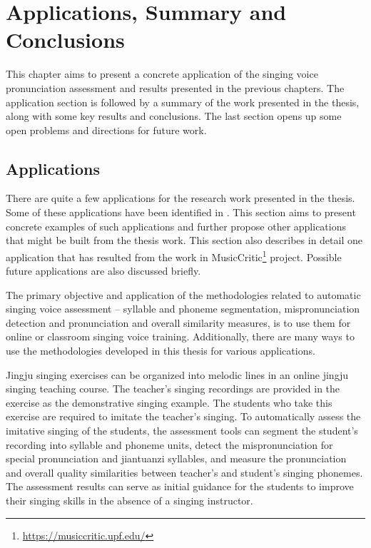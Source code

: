 \chapter{Applications, Summary and Conclusions}\label{chap:conclusions}

This chapter aims to present a concrete application of the singing voice pronunciation assessment and results presented in the previous chapters. The application section is followed by a summary of the work presented in the thesis, along with some key results and conclusions. The last section opens up some open problems and directions for future work. 

\section{Applications}

There are quite a few applications for the research work presented in the thesis. Some of these applications have been identified in . This section aims to present concrete examples of such applications and further propose other applications that might be built from the thesis work. This section also describes in detail one application that has resulted from the work in MusicCritic\footnote{\url{https://musiccritic.upf.edu/}} project. Possible future applications are also discussed briefly.

The primary objective and application of the methodologies related to automatic singing voice assessment -- syllable and phoneme segmentation, mispronunciation detection and pronunciation and overall similarity measures, is to use them for online or classroom singing voice training. Additionally, there are many ways to use the methodologies developed in this thesis for various applications.

Jingju singing exercises can be organized into melodic lines in an online jingju singing teaching course. The teacher's singing recordings are provided in the exercise as the demonstrative singing example. The students who take this exercise are required to imitate the teacher's singing. To automatically assess the imitative singing of the students, the assessment tools can segment the student's recording into syllable and phoneme units, detect the mispronunciation for special pronunciation and \gls{jiantuanzi} syllables, and measure the pronunciation and overall quality similarities between teacher's and student's singing phonemes. The assessment results can serve as initial guidance for the students to improve their singing skills in the absence of a singing instructor.

